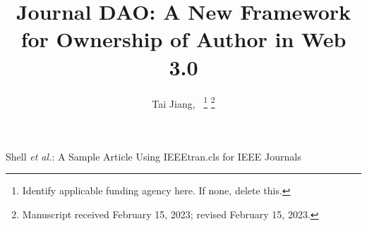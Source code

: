 \documentclass[lettersize,journal]{IEEEtran}
\begin{document}
\title{Journal DAO: A New Framework for Ownership of Author in Web 3.0}

\author{Tai Jiang,~
\thanks{Identify applicable funding agency here. If none, delete this.}%
\thanks{Manuscript received February 15, 2023; revised February 15, 2023.}}

%
{Shell \MakeLowercase{\textit{et al.}}: A Sample Article Using IEEEtran.cls for IEEE Journals}


\maketitle
\end{document}
